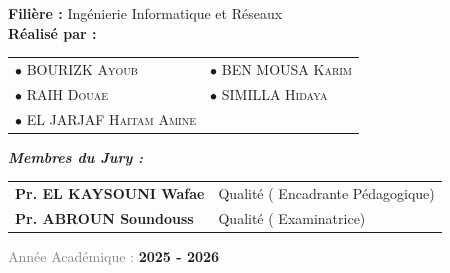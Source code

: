 \begin{titlepage}
\vspace{1.5cm}

\noindent
\begin{minipage}{\linewidth}
    \flushleft
    {\large \sffamily \textcolor{darkslate}{\textbf{Filière :}}} {\large \sffamily Ingénierie Informatique et Réseaux} \\[0.6cm]
    {\LARGE \textsf{\textbf{\textcolor{emsigreen}{Réalisé par :}}}} \\[0.3cm]
    {\large \sffamily
    \begin{tabular}{@{}ll}
        $\bullet$ \textsc{BOURIZK Ayoub} & \hspace{1.5cm} $\bullet$ \textsc{BEN MOUSA Karim } \\[0.2cm]
        $\bullet$ \textsc{RAIH Douae} & \hspace{1.5cm} $\bullet$ \textsc{SIMILLA Hidaya} \\[0.2cm]
        $\bullet$ \textsc{EL JARJAF Haitam Amine}
    \end{tabular}}
\end{minipage}

\vfill 

\noindent
\begin{minipage}{\linewidth}
    \flushleft
    {\large \textbf{\textit{\textcolor{emsigreen}{Membres du Jury :}}}} \\[0.3cm]
    {\small \sffamily
    \begin{tabular}{@{}ll}
        \textbf{Pr. EL KAYSOUNI Wafae} & Qualité ( Encadrante Pédagogique) \\
        \textbf{Pr. ABROUN Soundouss} & Qualité ( Examinatrice) \\
    \end{tabular}}
\end{minipage}

\vfill

\begin{center}
    {\small \textcolor{gray}{Année Académique : } \textbf{2025 - 2026}}
\end{center}

\vspace{0.2cm}

\end{titlepage}
\restoregeometry



